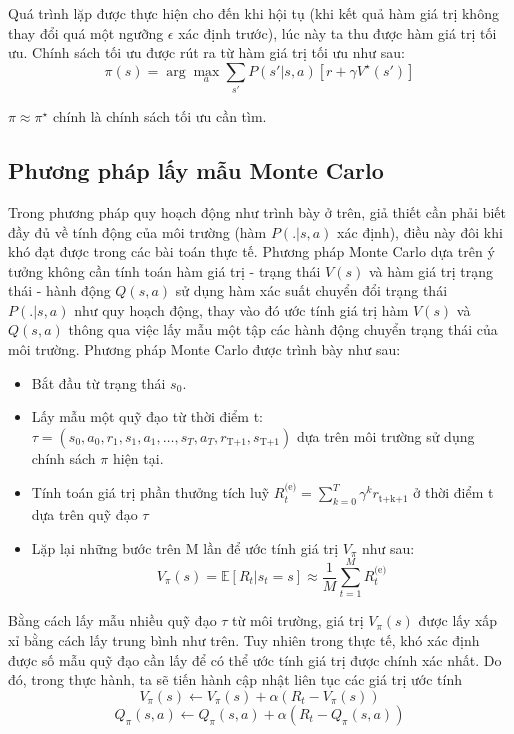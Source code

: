 \documentclass{uetgraduation}
\begin{document}
Quá trình lặp được thực hiện cho đến khi hội tụ (khi kết quả hàm giá trị không thay đổi quá một ngưỡng $\epsilon$ xác định trước), lúc này ta thu được hàm giá trị
tối ưu. Chính sách tối ưu được rút ra từ hàm giá trị tối ưu như sau:
\begin{equation}
    \pi (s) = \arg \max_a \sum_{s'} P(s'|s, a) [r + \gamma V^\star (s')]
\end{equation}

$\pi \approx \pi^\star$ chính là chính sách tối ưu cần tìm.

\subsection{Phương pháp lấy mẫu Monte Carlo}
Trong phương pháp quy hoạch động như trình bày ở trên, giả thiết cần phải biết đầy đủ về tính động của môi trường (hàm $P(.|s, a)$ xác định), điều này đôi khi khó đạt được
trong các bài toán thực tế. Phương pháp Monte Carlo dựa trên ý tưởng không cần tính toán hàm giá trị - trạng thái $V(s)$ và hàm giá trị trạng thái - hành động
$Q(s,a)$ sử dụng hàm xác suất chuyển đổi trạng thái $P(.|s, a)$ như quy hoạch động, thay vào đó ước tính giá trị hàm $V(s)$ và $Q(s,a)$ thông qua việc lấy mẫu
một tập các hành động chuyển trạng thái của môi trường. Phương pháp Monte Carlo được trình bày như sau:
\begin{itemize}
    \item Bắt đầu từ trạng thái $s_0$.
    \item Lấy mẫu một quỹ đạo từ thời điểm t: $\tau = (s_0, a_0, r_1, s_1, a_1, \dots, s_T, a_T, r_\text{T+1}, s_\text{T+1})$ dựa trên môi trường sử dụng chính
    sách $\pi$ hiện tại.
    \item Tính toán giá trị phần thưởng tích luỹ $R_t^\text{(e)} = \sum_{k=0}^{T} \gamma^k r_\text{t+k+1}$ ở thời điểm t dựa trên quỹ đạo $\tau$
    \item Lặp lại những bước trên M lần để ước tính giá trị $V_\pi$ như sau:
    \begin{equation}
        V_\pi (s) = \mathbb{E} [R_t | s_t = s] \approx \frac{1}{M} \sum_{t=1}^{M} R_t^\text{(e)}
        \label{eq:v_monte_carlo}
    \end{equation}
\end{itemize}

Bằng cách lấy mẫu nhiều quỹ đạo $\tau$ từ môi trường, giá trị $V_\pi (s)$ được lấy xấp xỉ bằng cách lấy trung bình như trên. Tuy nhiên trong thực tế, khó xác
định được số mẫu quỹ đạo cần lấy để có thể ước tính giá trị được chính xác nhất. Do đó, trong thực hành, ta sẽ tiến hành cập nhật liên tục các giá trị ước tính
\begin{equation}
    V_\pi (s) \leftarrow V_\pi (s) + \alpha (R_t - V_\pi (s))
\end{equation}
\begin{equation}
    Q_\pi (s, a) \leftarrow Q_\pi (s, a) + \alpha (R_t - Q_\pi (s, a))
\end{equation}
\end{document}
